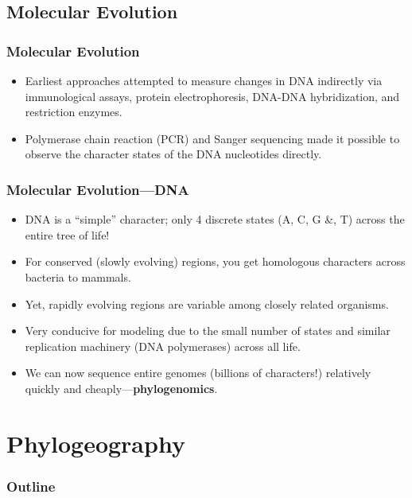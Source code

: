 \subsection{Molecular Evolution}


\begin{frame}
    \frametitle{Molecular Evolution}
    \begin{itemize}
        \item Earliest approaches attempted to measure changes in DNA
            indirectly via immunological assays, protein electrophoresis,
            DNA-DNA hybridization, and restriction enzymes.
        \item Polymerase chain reaction (PCR) and Sanger sequencing made it
            possible to observe the character states of the DNA nucleotides
            directly.
    \end{itemize}
\end{frame}

\begin{frame}
    \frametitle{Molecular Evolution---DNA}
    \begin{itemize}
        \item DNA is a ``simple'' character; only 4 discrete states (A, C, G
            \&, T) across the entire tree of life!
        \item For conserved (slowly evolving) regions, you get homologous
            characters across bacteria to mammals.
        \item Yet, rapidly evolving regions are variable among closely
            related organisms.
        \item Very conducive for modeling due to the small number of states and
            similar replication machinery (DNA polymerases) across all life.
        \item We can now sequence entire genomes (billions of characters!)
            relatively quickly and cheaply---\textbf{phylogenomics}.
    \end{itemize}
\end{frame}

\section{Phylogeography}

\begin{frame}
\frametitle{Outline}
\tableofcontents[currentsection]
\end{frame}

